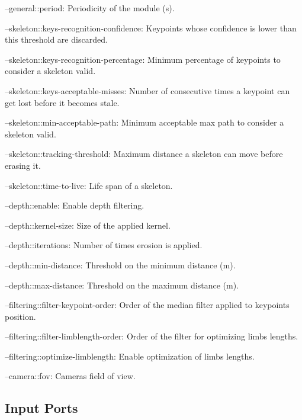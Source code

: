 \begin{DoxyItemize}
\item --general\+::period\+: Periodicity of the module (s).
\item --skeleton\+::keys-\/recognition-\/confidence\+: Keypoints whose confidence is lower than this threshold are discarded.
\item --skeleton\+::keys-\/recognition-\/percentage\+: Minimum percentage of keypoints to consider a skeleton valid.
\item --skeleton\+::keys-\/acceptable-\/misses\+: Number of consecutive times a keypoint can get lost before it becomes stale.
\item --skeleton\+::min-\/acceptable-\/path\+: Minimum acceptable max path to consider a skeleton valid.
\item --skeleton\+::tracking-\/threshold\+: Maximum distance a skeleton can move before erasing it.
\item --skeleton\+::time-\/to-\/live\+: Life span of a skeleton.
\item --depth\+::enable\+: Enable depth filtering.
\item --depth\+::kernel-\/size\+: Size of the applied kernel.
\item --depth\+::iterations\+: Number of times erosion is applied.
\item --depth\+::min-\/distance\+: Threshold on the minimum distance (m).
\item --depth\+::max-\/distance\+: Threshold on the maximum distance (m).
\item --filtering\+::filter-\/keypoint-\/order\+: Order of the median filter applied to keypoints\textquotesingle{} position.
\item --filtering\+::filter-\/limblength-\/order\+: Order of the filter for optimizing limbs\textquotesingle{} lengths.
\item --filtering\+::optimize-\/limblength\+: Enable optimization of limbs\textquotesingle{} lengths.
\item --camera\+::fov\+: Camera\textquotesingle{}s field of view. 
\end{DoxyItemize}\hypertarget{group__skeletonViewer_inputports_sec}{}\subsection{Input Ports}\label{group__skeletonViewer_inputports_sec}

